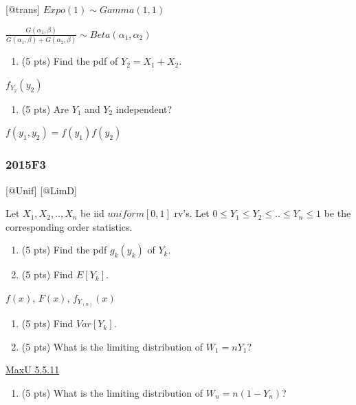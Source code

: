 \documentclass[6pt,twocolumn,Portrait]{article}
\providecommand{\tightlist}{%
  \setlength{\itemsep}{0pt}\setlength{\parskip}{0pt}}
\begin{document}
{[}@trans{]} \(Expo(1)\sim Gamma(1,1)\)

\(\frac{G(\alpha_1,\beta)}{G(\alpha_1,\beta)+G(\alpha_2,\beta)}\sim Beta(\alpha_1,\alpha_2)\)

\begin{enumerate}
\def\labelenumi{(\alph{enumi})}
\setcounter{enumi}{1}
\tightlist
\item
  (5 pts) Find the pdf of \(Y_2=X_1+X_2\).
\end{enumerate}

\(f_{Y_2}(y_2)\)

\begin{enumerate}
\def\labelenumi{(\alph{enumi})}
\setcounter{enumi}{2}
\tightlist
\item
  (5 pts) Are \(Y_1\) and \(Y_2\) independent?
\end{enumerate}

\(f(y_1,y_2)=f(y_1)f(y_2)\)

\hypertarget{f3-5}{%
\subsubsection{2015F3}\label{f3-5}}

{[}@Unif{]} {[}@LimD{]}

Let \(X_1,X_2,..,X_{n}\) be iid \(uniform[0,1]\) rv's. Let
\(0\le Y_1\le Y_2\le..\le Y_n\le1\) be the corresponding order
statistics.

\begin{enumerate}
\def\labelenumi{(\alph{enumi})}
\item
  (5 pts) Find the pdf \(g_k(y_k)\) of \(Y_k\).
\item
  (5 pts) Find \(E[Y_k]\).
\end{enumerate}

\(f(x)\), \(F(x)\), \(f_{Y_{(n)}}(x)\)

\begin{enumerate}
\def\labelenumi{(\alph{enumi})}
\setcounter{enumi}{2}
\item
  (5 pts) Find \(Var[Y_k]\).
\item
  (5 pts) What is the limiting distribution of \(W_1=nY_1\)?
\end{enumerate}

\protect\hyperlink{Max-Unif}{MaxU 5.5.11}

\begin{enumerate}
\def\labelenumi{(\alph{enumi})}
\setcounter{enumi}{4}
\tightlist
\item
  (5 pts) What is the limiting distribution of \(W_n=n(1-Y_n)\)?
\end{enumerate}
\end{document}
